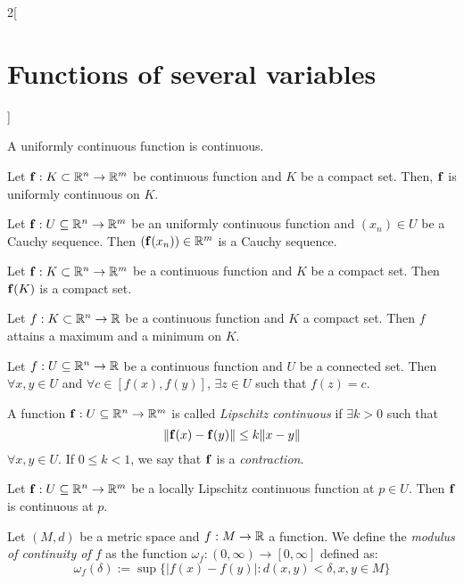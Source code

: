 \documentclass[../../../main.tex]{subfiles}
\begin{document}
\begin{multicols}{2}[\section{Functions of several variables}]
\begin{definition}
  \end{definition}
  \begin{corollary}
    A uniformly continuous function is continuous.
  \end{corollary}
  \begin{theorem}
    Let $\boldsymbol{\mathrm{f}}:K\subset\mathbb{R}^n\rightarrow\mathbb{R}^m$ be continuous function and $K$ be a compact set. Then, $\boldsymbol{\mathrm{f}}$ is uniformly continuous on $K$.
  \end{theorem}
  \begin{theorem}
    Let $\boldsymbol{\mathrm{f}}:U\subseteq\mathbb{R}^n\rightarrow\mathbb{R}^m$ be an uniformly continuous function and $(x_n)\in U$ be a Cauchy sequence. Then $(\boldsymbol{\mathrm{f}}(x_n))\in\mathbb{R}^m$ is a Cauchy sequence.
  \end{theorem}
  \begin{theorem}
    Let $\boldsymbol{\mathrm{f}}:K\subset\mathbb{R}^n\rightarrow\mathbb{R}^m$ be a continuous function and $K$ be a compact set. Then $\boldsymbol{\mathrm{f}}(K)$ is a compact set.
  \end{theorem}
  \begin{theorem}
    Let $f:K\subset\mathbb{R}^n\rightarrow\mathbb{R} $ be a continuous function and $K$ a compact set. Then $f$ attains a maximum and a minimum on $K$.
  \end{theorem}
  \begin{theorem}
    Let $f:U\subseteq\mathbb{R}^n\rightarrow\mathbb{R} $ be a continuous function and $U$ be a connected set. Then $\forall x,y\in U$ and $\forall c\in[f(x),f(y)]$, $\exists z\in U$ such that $f(z)=c$.
  \end{theorem}
  \begin{definition}
    A function $\boldsymbol{\mathrm{f}}:U\subseteq\mathbb{R}^n\rightarrow\mathbb{R}^m$ is called \textit{Lipschitz continuous} if $\exists k>0$ such that $$\|\boldsymbol{\mathrm{f}}(x)-\boldsymbol{\mathrm{f}}(y)\|\leq k\|x-y\|$$ $\forall x,y\in U$. If $0\leq k<1$, we say that $\boldsymbol{\mathrm{f}}$ is a \textit{contraction}.
    \label{FOSV_contr}
  \end{definition}
  \begin{prop}
    Let $\boldsymbol{\mathrm{f}}:U\subseteq\mathbb{R}^n\rightarrow\mathbb{R}^m$ be a locally Lipschitz continuous function at $p\in U$. Then $\boldsymbol{\mathrm{f}}$ is continuous at $p$.
  \end{prop}
  \begin{definition}
    Let $(M,d)$ be a metric space and $f:M\rightarrow\mathbb{R} $ a function. We define the \textit{modulus of continuity of $f$} as the function $\omega_f:(0,\infty)\rightarrow[0,\infty]$ defined as: $$\omega_f(\delta):=\sup\{|f(x)-f(y)|:d(x,y)<\delta, x,y\in M\}$$
  \end{definition}

\end{multicols}
\end{document}
